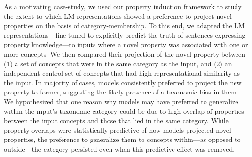 \documentclass[10pt,letterpaper]{article}
\begin{document}
As a motivating case-study, we used our property induction framework to study the extent to which LM representations showed a preference to project novel properties on the basis of category-membership. 
To this end, we adapted the LM representations---fine-tuned to explicitly predict the truth of sentences expressing property knowledge---to inputs where a novel property was associated with one or more concepts. We then compared their projection of the novel property between (1) a set of concepts that were in the same category as the input, and (2) an independent control-set of concepts that had high-representational similarity as the input.
In majority of cases, models consistently preferred to project the new property to former, suggesting the likely presence of a taxonomic bias in them.
We hypothesized that one reason why models may have preferred to generalize within the input's taxonomic category could be due to high overlap of properties between the input concepts and those that lied in the same category. 
While property-overlaps were statistically predictive of how models projected novel properties, the preference to generalize them  to concepts within---as opposed to outside---the category persisted even when this predictive effect was removed.
\end{document}
